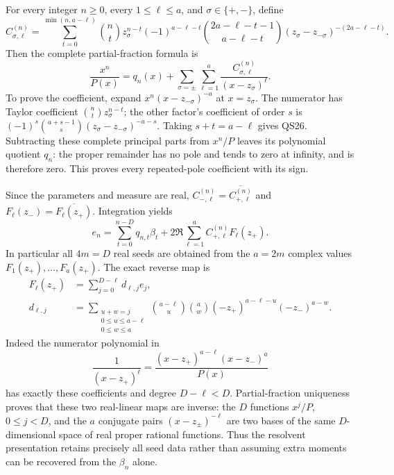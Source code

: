 \documentclass[11pt]{article}
\begin{document}
For every integer \(n\ge0\), every \(1\le\ell\le a\), and
\(\sigma\in\{+,-\}\), define
\begin{equation}\tag{QS26}
 C_{\sigma,\ell}^{(n)}
 =\sum_{t=0}^{\min(n,a-\ell)}
  \binom nt z_\sigma^{n-t}(-1)^{a-\ell-t}
  \binom{2a-\ell-t-1}{a-\ell-t}
      (z_\sigma-z_{-\sigma})^{-(2a-\ell-t)} .
\end{equation}
Then the complete partial-fraction formula is
\begin{equation}\tag{QS27}
 \frac{x^n}{P(x)}
 =q_n(x)+\sum_{\sigma=\pm}\sum_{\ell=1}^a
                      \frac{C_{\sigma,\ell}^{(n)}}{(x-z_\sigma)^\ell}.
\end{equation}
To prove the coefficient, expand
\(x^n(x-z_{-\sigma})^{-a}\) at \(x=z_\sigma\).
The numerator has Taylor coefficient
\(\binom nt z_\sigma^{n-t}\);
the other factor's coefficient of order \(s\) is
\((-1)^s\binom{a+s-1}{s}
(z_\sigma-z_{-\sigma})^{-a-s}\).
Taking \(s+t=a-\ell\) gives QS26.
Subtracting these complete principal parts from \(x^n/P\)
leaves its polynomial quotient \(q_n\): the proper remainder
has no pole and tends to zero at infinity, and is therefore zero.
This proves every repeated-pole coefficient with its sign.

Since the parameters and measure are real,
\(C_{-,\ell}^{(n)}=\overline{C_{+,\ell}^{(n)}}\) and
\(F_\ell(z_-)=\overline{F_\ell(z_+)}\). Integration yields
\begin{equation}\tag{QS28}
 e_n=\sum_{t=0}^{n-D}q_{n,t}\beta_t+
          2\Re\sum_{\ell=1}^a C_{+,\ell}^{(n)}F_\ell(z_+).
\end{equation}
In particular all \(4m=D\) real seeds are obtained from the
\(a=2m\) complex values \(F_1(z_+),\ldots,F_a(z_+)\).
The exact reverse map is
\begin{equation}\tag{QS29}
\begin{aligned}
 F_\ell(z_+)&=\sum_{j=0}^{D-\ell}d_{\ell,j}e_j,\\
 d_{\ell,j}
 &=\sum_{\substack{u+w=j\\0\le u\le a-\ell\\0\le w\le a}}
    \binom{a-\ell}{u}\binom aw
       (-z_+)^{a-\ell-u}(-z_-)^{a-w}.
\end{aligned}
\end{equation}
Indeed the numerator polynomial in
\[
 \frac1{(x-z_+)^\ell}
   =\frac{(x-z_+)^{a-\ell}(x-z_-)^a}{P(x)}
\]
has exactly these coefficients and degree \(D-\ell<D\).
Partial-fraction uniqueness proves that these two real-linear
maps are inverse: the \(D\) functions \(x^j/P\), \(0\le j<D\),
and the \(a\) conjugate pairs \((x-z_\pm)^{-\ell}\) are
two bases of the same \(D\)-dimensional space of real
proper rational functions. Thus the resolvent presentation
retains precisely all seed data rather than assuming extra
moments can be recovered from the \(\beta_n\) alone.
\end{document}
